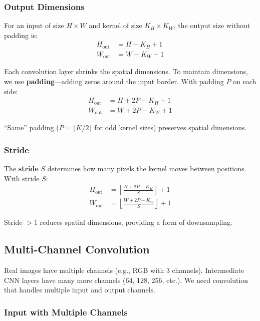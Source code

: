 \subsubsection{Output Dimensions}

For an input of size $H \times W$ and kernel of size $K_H \times K_W$, the output size without padding is:
\begin{align}
H_{\text{out}} &= H - K_H + 1 \\
W_{\text{out}} &= W - K_W + 1
\end{align}

Each convolution layer shrinks the spatial dimensions. To maintain dimensions, we use \textbf{padding}---adding zeros around the input border. With padding $P$ on each side:
\begin{align}
H_{\text{out}} &= H + 2P - K_H + 1 \\
W_{\text{out}} &= W + 2P - K_W + 1
\end{align}

``Same'' padding ($P = \lfloor K/2 \rfloor$ for odd kernel sizes) preserves spatial dimensions.

\subsubsection{Stride}

The \textbf{stride} $S$ determines how many pixels the kernel moves between positions. With stride $S$:
\begin{align}
H_{\text{out}} &= \left\lfloor \frac{H + 2P - K_H}{S} \right\rfloor + 1 \\
W_{\text{out}} &= \left\lfloor \frac{W + 2P - K_W}{S} \right\rfloor + 1
\end{align}

Stride $> 1$ reduces spatial dimensions, providing a form of downsampling.

\subsection{Multi-Channel Convolution}

Real images have multiple channels (e.g., RGB with 3 channels). Intermediate CNN layers have many more channels (64, 128, 256, etc.). We need convolution that handles multiple input and output channels.

\subsubsection{Input with Multiple Channels}

